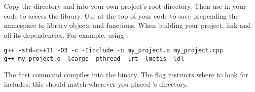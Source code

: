 Copy the  directory and  into your own project's root directory. Then
use  in your code to access the library. Use
 at the top of your code to save prepending the
 namespace to library objects and functions. When building your
project, link  and all its dependencies. For example, using :
\begin{verbatim}
g++ -std=c++11 -O3 -c -Iinclude -o my_project.o my_project.cpp
g++ my_project.o -lcargo -pthread -lrt -lmetis -ldl
\end{verbatim}
The first  command compiles  into the
 binary. The  flag instructs  where to
look for includes; this should match wherever you placed 's 
directory.

